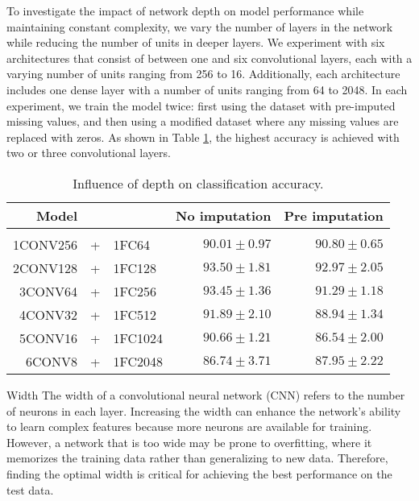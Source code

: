 To investigate the impact of network depth on model performance while maintaining constant complexity, we vary the number of layers in the network while reducing the number of units in deeper layers.
We experiment with six architectures that consist of between one and six convolutional layers, each with a varying number of units ranging from 256 to 16.
Additionally, each architecture includes one dense layer with a number of units ranging from 64 to 2048. 
In each experiment, we train the model twice: first using the dataset with pre-imputed missing values, and then using a modified dataset where any missing values are replaced with zeros.
As shown in Table \ref{tab:temCNNdepth}, the highest accuracy is achieved with two or three convolutional layers.

\begin{table}[!htbp]
  \centering
   \begin{tabular}{rclrr}
   Model&&                  & No imputation         & Pre imputation             \\[0.2cm]
   \hline \\[-0.2cm]
    1CONV256 &+& 1FC64   	 & $90.01 \pm 0.97$ 	 & $90.80 \pm 0.65$\\
    2CONV128 &+& 1FC128  	 & $\mathbf{93.50 \pm 1.81}$ 	 & $\mathbf{92.97 \pm 2.05}$\\
    3CONV64 &+& 1FC256   	 & $93.45 \pm 1.36$ 	 & $91.29 \pm 1.18$\\
    4CONV32 &+& 1FC512   	 & $91.89 \pm 2.10$ 	 & $88.94 \pm 1.34$\\
    5CONV16 &+& 1FC1024  	 & $90.66 \pm 1.21$ 	 & $86.54 \pm 2.00$\\
    6CONV8 &+& 1FC2048   	 & $86.74 \pm 3.71$ 	 & $87.95 \pm 2.22$\\
   \end{tabular}
   \caption{Influence of depth on classification accuracy.}
   \label{tab:temCNNdepth}
 \end{table}

\begin{paragraph}{Width}
The width of a convolutional neural network (CNN) refers to the number of neurons in each layer.
Increasing the width can enhance the network's ability to learn complex features because more neurons are available for training.
However, a network that is too wide may be prone to overfitting, where it memorizes the training data rather than generalizing to new data.
Therefore, finding the optimal width is critical for achieving the best performance on the test data.
\end{paragraph}

